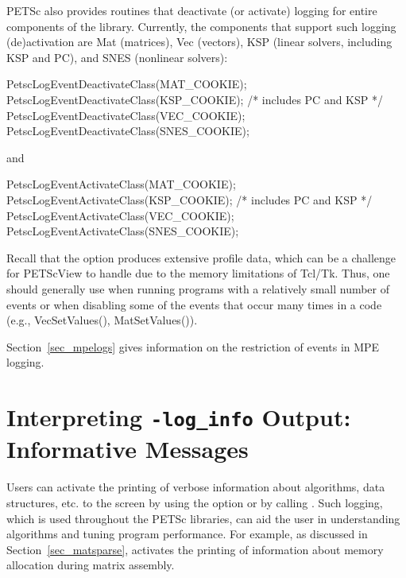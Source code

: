 {{PETSc also provides routines that deactivate (or activate)
logging for entire components of the library. Currently, the 
components that support such logging (de)activation are Mat (matrices),
Vec (vectors), KSP (linear solvers, including KSP 
and PC), and SNES (nonlinear solvers):
\begin{tabbing}
   PetscLogEventDeactivateClass(MAT\_COOKIE);\\
   PetscLogEventDeactivateClass(KSP\_COOKIE); /* includes PC and KSP */\\
   PetscLogEventDeactivateClass(VEC\_COOKIE);\\
   PetscLogEventDeactivateClass(SNES\_COOKIE);
\end{tabbing}
and 
\begin{tabbing}
   PetscLogEventActivateClass(MAT\_COOKIE);\\
   PetscLogEventActivateClass(KSP\_COOKIE);   /* includes PC and KSP */\\
   PetscLogEventActivateClass(VEC\_COOKIE);\\
   PetscLogEventActivateClass(SNES\_COOKIE);
\end{tabbing}

Recall that the option  produces extensive profile
data, which can be a challenge for PETScView to handle due to
the memory limitations of Tcl/Tk.  Thus, one should generally use
 when running programs with a relatively small
number of events or when disabling some of the events that occur many
times in a code (e.g., VecSetValues(), MatSetValues()).

Section~\ref{sec_mpelogs} gives information on the restriction of events
in MPE logging.


\section{Interpreting {\tt -log\_info} Output: Informative Messages}
\label{sec_PetscLoginfo}

Users can activate the printing of verbose information about
algorithms, data structures, etc. to the screen by using the option   or by calling . 
Such logging, which is used throughout the PETSc libraries,
can aid the user in understanding algorithms and 
tuning program performance.  For example, as discussed in
Section~\ref{sec_matsparse},  activates the
printing of information about memory allocation during
matrix assembly.

}}
